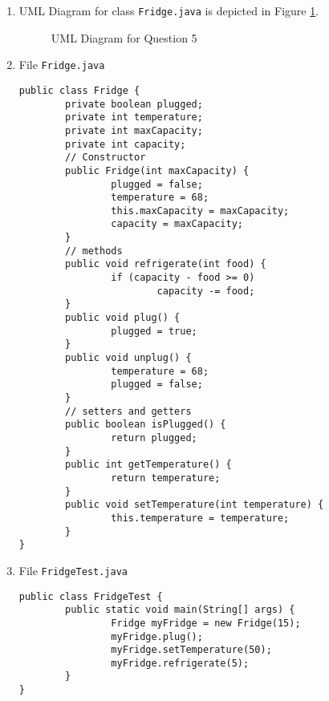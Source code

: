 \documentclass[12pt,letterpaper,twoside]{article}
\begin{document}
\begin{enumerate}[label=(\alph*)]

\item UML Diagram for class \texttt{Fridge.java} is depicted in Figure \ref{fig2}.
	\begin{figure}[H]
	\centering
	\caption{UML Diagram for Question 5}\label{fig2}
	\end{figure}

\item File \texttt{Fridge.java}
\lstset{language=java, tabsize=2}
\begin{lstlisting}
public class Fridge {
		private boolean plugged;
		private int temperature;
		private int maxCapacity;
		private int capacity;
		// Constructor
		public Fridge(int maxCapacity) {
				plugged = false;
				temperature = 68;
				this.maxCapacity = maxCapacity;
				capacity = maxCapacity;
		}
		// methods
		public void refrigerate(int food) {
				if (capacity - food >= 0)
						capacity -= food;
		}
		public void plug() {
				plugged = true;
		}
		public void unplug() {
				temperature = 68;
				plugged = false;
		}
		// setters and getters
		public boolean isPlugged() {
				return plugged;
		}
		public int getTemperature() {
				return temperature;
		}
		public void setTemperature(int temperature) {
				this.temperature = temperature;
		}
}
\end{lstlisting}

\item File \texttt{FridgeTest.java}
\lstset{language=java, tabsize=2}
\begin{lstlisting}
public class FridgeTest {
		public static void main(String[] args) {
				Fridge myFridge = new Fridge(15);
				myFridge.plug();
				myFridge.setTemperature(50);
				myFridge.refrigerate(5);
		}
}
\end{lstlisting}
\end{enumerate}
\end{document}
